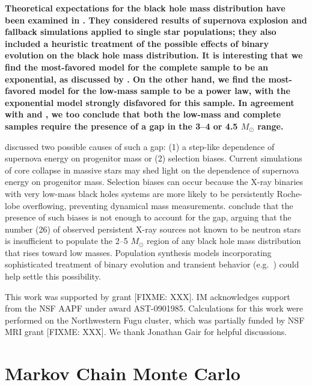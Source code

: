 \documentclass[preprint]{aastex}
\newcommand{\fixme}[1]{[FIXME: #1]}
\newcommand{\Msun}{M_\odot}
\newcommand{\changed}[1]{{\bf #1 }}
\begin{document}
\changed{Theoretical expectations for the black hole mass distribution
  have been examined in \citet{Fryer2001}.  They considered results of
  supernova explosion and fallback simulations \citep{Fryer1999}
  applied to single star populations; they also included a heuristic
  treatment of the possible effects of binary evolution on the black
  hole mass distribution.  It is interesting that we find the
  most-favored model for the complete sample to be an exponential, as
  discussed by \citet{Fryer1999}.  On the other hand, we find the
  most-favored model for the low-mass sample to be a power law, with
  the exponential model strongly disfavored for this sample. In
  agreement with \citet{Bailyn1998} and \citet{Ozel2010}, we too
  conclude that both the low-mass and complete samples require the
  presence of a gap in the 3--4 or 4.5 $\Msun$ range.

  \citet{Fryer1999} discussed two possible causes of such a gap: (1) a
  step-like dependence of supernova energy on progenitor mass or (2)
  selection biases.  Current simulations of core collapse in massive
  stars may shed light on the dependence of supernova energy on
  progenitor mass.  Selection biases can occur because the X-ray
  binaries with very low-mass black holes systems are more likely to
  be persistently Roche-lobe overflowing, preventing dynamical mass
  measurements.  \citet{Ozel2010} conclude that the presence of such
  biases is not enough to account for the gap, arguing that the number
  (26) of observed persistent X-ray sources not known to be neutron
  stars is insufficient to populate the 2--5 $\Msun$ region of any
  black hole mass distribution that rises toward low masses.
  Population synthesis models incorporating sophisticated treatment of
  binary evolution and transient behavior (e.g.\
  \citet{Fragos2008,Fragos2009}) could help settle this possibility.}

\acknowledgements

This work was supported by grant \fixme{XXX}.  IM acknowledges support
from the NSF AAPF under award AST-0901985.  Calculations for this work
were performed on the Northwestern Fugu cluster, which was partially
funded by NSF MRI grant \fixme{XXX}.  We thank Jonathan Gair for
helpful discussions.

\appendix

\section{Markov Chain Monte Carlo}
\end{document}
